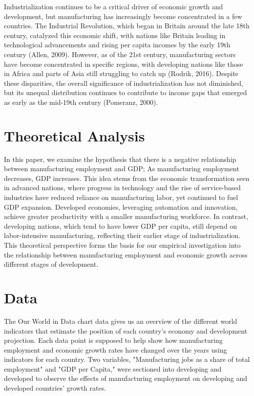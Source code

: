 \documentclass[12pt]{article}
\begin{document}
Industrialization continues to be a critical driver of economic growth and development, but manufacturing has increasingly become concentrated in a few countries. The Industrial Revolution, which began in Britain around the late 18th century, catalyzed this economic shift, with nations like Britain leading in technological advancements and rising per capita incomes by the early 19th century (Allen, 2009). However, as of the 21st century, manufacturing sectors have become concentrated in specific regions, with developing nations like those in Africa and parts of Asia still struggling to catch up (Rodrik, 2016). Despite these disparities, the overall significance of industrialization has not diminished, but its unequal distribution continues to contribute to income gaps that emerged as early as the mid-19th century (Pomeranz, 2000).

\section{Theoretical Analysis}
\label{sec:theory}
In this paper, we examine the hypothesis that there is a negative relationship between manufacturing employment and GDP; As manufacturing employment decreases, GDP increases. This idea stems from the economic transformation seen in advanced nations, where progress in technology and the rise of service-based industries have reduced reliance on manufacturing labor, yet continued to fuel GDP expansion. Developed economies, leveraging automation and innovation, achieve greater productivity with a smaller manufacturing workforce. In contrast, developing nations, which tend to have lower GDP per capita, still depend on labor-intensive manufacturing, reflecting their earlier stage of industrialization. This theoretical perspective forms the basis for our empirical investigation into the relationship between manufacturing employment and economic growth across different stages of development.

\section{Data}
\label{sec:data}

The Our World in Data chart data gives us an overview of the different world indicators that estimate the position of each country's economy and development projection. Each data point is supposed to help show how manufacturing employment and economic growth rates have changed over the years using indicators for each country. Two variables, "Manufacturing jobs as a share of total employment" and "GDP per Capita," were sectioned into developing and developed to observe the effects of manufacturing employment on developing and developed countries' growth rates.
\end{document}

